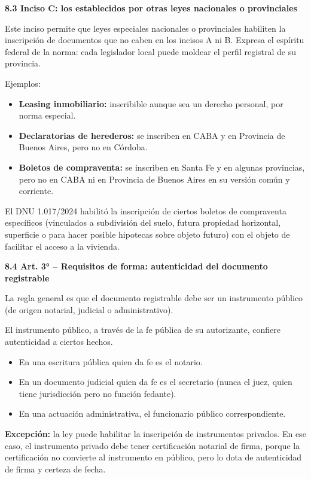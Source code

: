 \documentclass[11pt]{article}
\newcommand{\subheading}[1]{%
  \vspace{7pt}
  {\fontsize{12}{14}\selectfont\bfseries\color{navy}#1}\par
  \vspace{2pt}
}
\newenvironment{wordlist}
{\begin{itemize}[leftmargin=1.35em,itemsep=2pt,topsep=2pt,parsep=0pt]}
{\end{itemize}}
\begin{document}
\subheading{8.3 Inciso C: los establecidos por otras leyes nacionales o provinciales}

Este inciso permite que leyes especiales nacionales o provinciales habiliten la inscripción de documentos que no caben en los incisos A ni B. Expresa el espíritu federal de la norma: cada legislador local puede moldear el perfil registral de su provincia.

Ejemplos:

\begin{wordlist}
\item \textbf{Leasing inmobiliario:} inscribible aunque sea un derecho personal, por norma especial.
\item \textbf{Declaratorias de herederos:} se inscriben en CABA y en Provincia de Buenos Aires, pero no en Córdoba.
\item \textbf{Boletos de compraventa:} se inscriben en Santa Fe y en algunas provincias, pero no en CABA ni en Provincia de Buenos Aires en su versión común y corriente.
\end{wordlist}

El DNU 1.017/2024 habilitó la inscripción de ciertos boletos de compraventa específicos (vinculados a subdivisión del suelo, futura propiedad horizontal, superficie o para hacer posible hipotecas sobre objeto futuro) con el objeto de facilitar el acceso a la vivienda.

\subheading{8.4 Art. 3° -- Requisitos de forma: autenticidad del documento registrable}

La regla general es que el documento registrable debe ser un instrumento público (de origen notarial, judicial o administrativo).

El instrumento público, a través de la fe pública de su autorizante, confiere autenticidad a ciertos hechos.

\begin{wordlist}
\item En una escritura pública quien da fe es el notario.
\item En un documento judicial quien da fe es el secretario (nunca el juez, quien tiene jurisdicción pero no función fedante).
\item En una actuación administrativa, el funcionario público correspondiente.
\end{wordlist}

\textbf{Excepción:} la ley puede habilitar la inscripción de instrumentos privados. En ese caso, el instrumento privado debe tener certificación notarial de firma, porque la certificación no convierte al instrumento en público, pero lo dota de autenticidad de firma y certeza de fecha.
\end{document}
